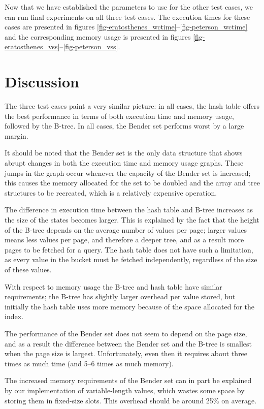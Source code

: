 \documentclass{acm_proc_article-sp}
\begin{document}
Now that we have established the parameters to use for the other test cases,
we can run final experiments on all three test cases.
The execution times for these cases are presented in figures
\ref{fig-eratosthenes_wctime}--\ref{fig-peterson_wctime}
and the corresponding memory usage is presented in
figures \ref{fig-eratosthenes_vss}--\ref{fig-peterson_vss}.

\section{Discussion}
The three test cases paint a very similar picture: in all cases, the hash table
offers the best performance in terms of both execution time and memory usage,
followed by the B-tree. In all cases, the Bender set performs worst by a large
margin.

It should be noted that the Bender set is the only data structure that shows
abrupt changes in both the execution time and memory usage graphs. These
jumps in the graph occur whenever the capacity of the Bender set is increased;
this causes the memory allocated for the set to be doubled and the array and
tree structures to be recreated, which is a relatively expensive operation.

The difference in execution time between the hash table and B-tree increases as
the size of the states becomes larger. This is explained by the fact that the
height of the B-tree depends on the average number of values per page; larger
values means less values per page, and therefore a deeper tree, and as a
result more pages to be fetched for a query. The hash table does not have such a
limitation, as every value in the bucket must be fetched independently, regardless
of the size of these values.

With respect to memory usage the B-tree and hash table have similar requirements;
the B-tree has slightly larger overhead per value stored, but initially the hash
table uses more memory because of the space allocated for the index.

The performance of the Bender set does not seem to depend on the page size,
and as a result the difference between the Bender set and the B-tree is smallest
when the page size is largest. Unfortunately, even then it requires about three
times as much time (and 5--6 times as much memory).

The increased memory requirements of the Bender set can in part be explained by
our implementation of variable-length values, which wastes some space by storing
them in fixed-size slots. This overhead should be around 25\% on average.
\end{document}
